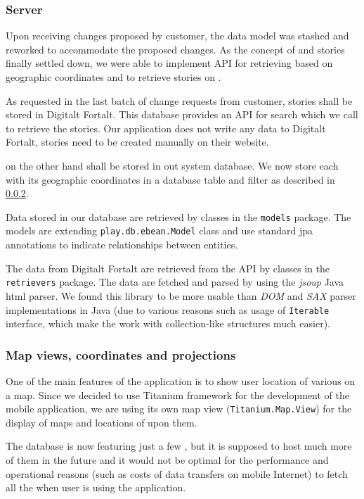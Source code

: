 \documentclass[11pt]{book}
\begin{document}
\subsubsection{Server}

Upon receiving changes proposed by customer, the data model was stashed and reworked to accommodate the proposed changes. As the concept of \wallentityp and stories finally settled down, we were able to implement API for retrieving \wallentityp based on geographic coordinates and to retrieve stories on \wallentityp.

As requested in the last batch of change requests from customer, stories shall be stored in Digitalt Fortalt. This database provides an API for search which we call to retrieve the stories. Our application does not write any data to Digitalt Fortalt, stories need to be created manually on their website.

\wallentitypcap on the other hand shall be stored in out system database. We now store each \wallentitys with its geographic coordinates in a database table and filter as described in \ref{sec:spr3_maps}. 

Data stored in our database are retrieved by classes in the \texttt{models} package. The models are extending \texttt{play.db.ebean.Model} class and use standard \gls{jpa} annotations to indicate relationships between entities.

The data from Digitalt Fortalt are retrieved from the API by classes in the \texttt{retrievers} package. The data are fetched and parsed by using the \emph{jsoup} Java \gls{html} parser. We found this library to be more usable than \emph{DOM} and \emph{SAX} parser implementations in Java (due to various reasons such as usage of \texttt{Iterable} interface, which make the work with collection-like structures much easier).

\subsubsection{Map views, coordinates and projections} \label{sec:spr3_maps}

One of the main features of the application is to show user location of various \wallentityp on a map. Since we decided to use Titanium framework for the development of the mobile application, we are using its own map view (\texttt{Titanium.Map.View}) for the display of maps and locations of \wallentityp upon them.

The database is now featuring just a few \wallentityp, but it is supposed to host much more of them in the future and it would not be optimal for the performance and operational reasons (such as costs of data transfers on mobile Internet) to fetch all the \wallentityp when user is using the application.
\end{document}
